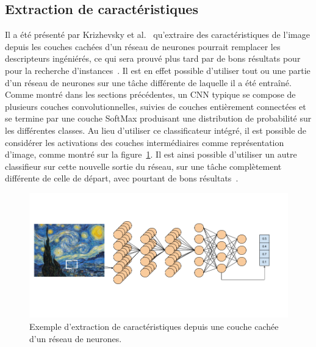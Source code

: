 \subsection{Extraction de caractéristiques}
\label{sec:extractfeatures}

Il a été présenté par Krizhevsky et al.~\cite{krizhevsky2012imagenet} qu'extraire des caractéristiques de l'image depuis les couches cachées d'un réseau de neurones pourrait remplacer les descripteurs ingéniérés, ce qui sera prouvé plus tard par de bons résultats pour pour la recherche d'instances~\cite{sharif2014cnn}.
Il est en effet possible d'utiliser tout ou une partie d'un réseau de neurones sur une tâche différente de laquelle il a été entraîné.
Comme montré dans les sections précédentes, un CNN typique se compose de plusieurs couches convolutionnelles, suivies de couches entièrement connectées et se termine par une couche SoftMax produisant une distribution de probabilité sur les différentes classes. 
Au lieu d’utiliser ce classificateur intégré, il est possible de considérer les activations des couches intermédiaires comme représentation d'image, comme montré sur la figure~\ref{fig:extractfeatures}.
Il est ainsi possible d'utiliser un autre classifieur sur cette nouvelle sortie du réseau, sur une tâche complètement différente de celle de départ, avec pourtant de bons résultats~\cite{oquab2014learning}.


\begin{figure}[ht!]
\includegraphics[width=\columnwidth]{figures/ExtractFeatures.png}%
\caption{Exemple d'extraction de caractéristiques depuis une couche cachée d'un réseau de neurones.}%
\label{fig:extractfeatures}%
\end{figure}



